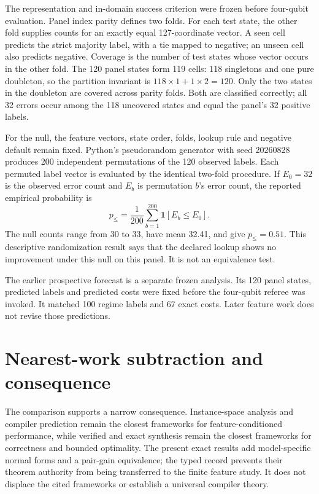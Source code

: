 \documentclass[a4paper,onecolumn,11pt,unpublished,noarxiv]{quantumarticle}
\begin{document}
The representation and in-domain success criterion were frozen before four-qubit evaluation.  Panel index parity defines two folds.  For each test state, the other fold supplies counts for an exactly equal 127-coordinate vector.  A seen cell predicts the strict majority label, with a tie mapped to negative; an unseen cell also predicts negative.  Coverage is the number of test states whose vector occurs in the other fold.  The 120 panel states form 119 cells: 118 singletons and one pure doubleton, so the partition invariant is $118\times1+1\times2=120$.  Only the two states in the doubleton are covered across parity folds.  Both are classified correctly; all 32 errors occur among the 118 uncovered states and equal the panel's 32 positive labels.

For the null, the feature vectors, state order, folds, lookup rule and negative default remain fixed.  Python's pseudorandom generator with seed 20260828 produces 200 independent permutations of the 120 observed labels.  Each permuted label vector is evaluated by the identical two-fold procedure.  If $E_0=32$ is the observed error count and $E_b$ is permutation $b$'s error count, the reported empirical probability is
\begin{equation}
p_{\le}=\frac1{200}\sum_{b=1}^{200}\mathbf1[E_b\le E_0].
\end{equation}
The null counts range from 30 to 33, have mean 32.41, and give $p_{\le}=0.51$.  This descriptive randomization result says that the declared lookup shows no improvement under this null on this panel.  It is not an equivalence test.

The earlier prospective forecast is a separate frozen analysis.  Its 120 panel states, predicted labels and predicted costs were fixed before the four-qubit referee was invoked.  It matched 100 regime labels and 67 exact costs.  Later feature work does not revise those predictions.

\section{Nearest-work subtraction and consequence}\label{sec:nearest-work}

\NearestWorkTable
\FloatBarrier

The comparison supports a narrow consequence.  Instance-space analysis and compiler prediction remain the closest frameworks for feature-conditioned performance, while verified and exact synthesis remain the closest frameworks for correctness and bounded optimality.  The present exact results add model-specific normal forms and a pair-gain equivalence; the typed record prevents their theorem authority from being transferred to the finite feature study.  It does not displace the cited frameworks or establish a universal compiler theory.
\end{document}

